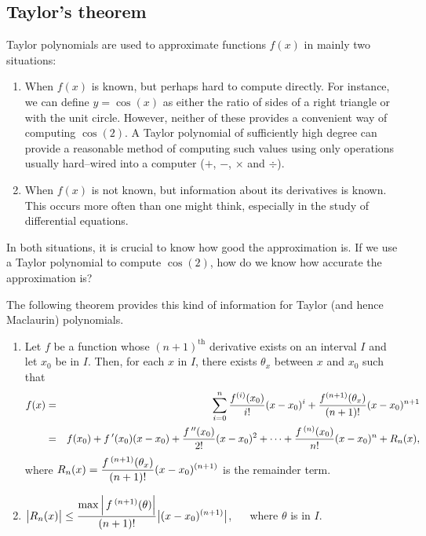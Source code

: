 \subsection{Taylor's theorem}

Taylor polynomials are used to approximate functions $f(x)$ in mainly two situations:
	\begin{enumerate}
	\item		When $f(x)$ is known, but perhaps hard to compute directly. For instance, we can define $y=\cos (x)$ as either the ratio of sides of a right triangle or with the unit circle. However, neither of these provides a convenient way of computing $\cos (2)$. A Taylor polynomial of sufficiently high degree can provide a reasonable method of computing such values using only operations usually hard--wired into a computer ($+$, $-$, $\times$ and $\div$).
	
	\item		When $f(x)$ is not known, but information about its derivatives is known. This occurs more often than one might think, especially in the study of differential equations.
	\end{enumerate}
	
In both situations, it is crucial to know how good the approximation is. If we use a Taylor polynomial to compute $\cos (2)$, how do we know how accurate the approximation is? 

 The following theorem provides this kind of information for Taylor (and hence Maclaurin) polynomials.

\begin{theorem}\label{thm:taylorthm}
\begin{enumerate}
\item	Let $f$ be a function whose $(n+1)^\text{th}$ derivative exists on an interval $I$ and let $x_0$ be in $I$. Then, for each $x$ in $I$, there exists $\theta_x$ between $x$ and $x_0$ such that
\begin{eqnarray*}
f(x) &=&\sum_{i=0}^n\dfrac{f^{(i)}(x_0)}{i!}(x-x_0)^i+\dfrac{f^{(n+1)}(\theta_x)}{(n+1)!}(x-x_0)^{n+1}\\
&=& f(x_0) + f\,'(x_0)(x-x_0) + \frac{f\,''(x_0)}{2!}(x-x_0)^2+ \cdots +\frac{f\,^{(n)}(x_0)}{n!}(x-x_0)^n+R_n(x),
\end{eqnarray*}
where $\displaystyle R_n(x) = \frac{f\,^{(n+1)}(\theta_x)}{(n+1)!}(x-x_0)^{(n+1)}$ is the remainder term.

\item		$\displaystyle \big|R_n(x)\big| \leq \frac{\max\left|\,f\,^{(n+1)}(\theta)\right|}{(n+1)!}\big|(x-x_0)^{(n+1)}\big|$, $ \quad$ where $\theta$ is in $I$.
\end{enumerate}
\end{theorem}

